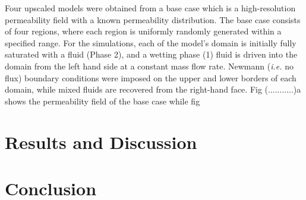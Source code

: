 \documentclass[preprint,12pt]{elsarticle}
\begin{document}
Four upscaled models were obtained from a base case which is a high-resolution permeability field with a known permeability distribution. The base case consists of four regions, where each region is uniformly randomly generated within a specified range. For the simulations, each of the model's domain is initially fully saturated with a fluid (Phase 2), and a wetting phase (1) fluid is driven into the domain from the left hand side at a constant mass flow rate. Newmann ({\it i.e.} no flux) boundary conditions were imposed on the upper and lower borders of each domain, while mixed fluids are recovered from the right-hand face. Fig (...........)a shows the permeability field of the base case while fig

\section{Results and Discussion}\label{section:results_discussion}

\section{Conclusion}\label{section:conclusion}





\clearpage 
 
%
%

  
\clearpage 

\listoftables
\clearpage
%
\clearpage  
\listoffigures
\clearpage

% 
\end{document}

